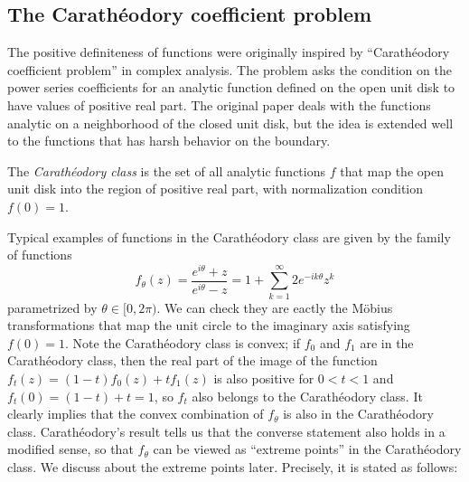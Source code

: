 \documentclass[12pt]{article}
\begin{document}
\subsection{The Carath\'eodory coefficient problem}

The positive definiteness of functions were originally inspired by ``Carath\'eodory coefficient problem'' in complex analysis.
The problem asks the condition on the power series coefficients for an analytic function defined on the open unit disk to have values of positive real part.
The original paper deals with the functions analytic on a neighborhood of the closed unit disk, but the idea is extended well to the functions that has harsh behavior on the boundary.

\begin{defn}
The \emph{Carath\'eodory class} is the set of all analytic functions $f$ that map the open unit disk into the region of positive real part, with normalization condition $f(0)=1$.
\end{defn}


Typical examples of functions in the Carath\'eodory class are given by the family of functions
\[f_\theta(z)=\frac{e^{i\theta}+z}{e^{i\theta}-z}=1+\sum_{k=1}^\infty2e^{-ik\theta}z^k\]
parametrized by $\theta\in[0,2\pi)$.
We can check they are eactly the M\"obius transformations that map the unit circle to the imaginary axis satisfying $f(0)=1$.
Note the Carath\'eodory class is convex; if $f_0$ and $f_1$ are in the Carath\'eodory class, then the real part of the image of the function $f_t(z)=(1-t)f_0(z)+tf_1(z)$ is also positive for $0<t<1$ and $f_t(0)=(1-t)+t=1$, so $f_t$ also belongs to the Carath\'eodory class.
It clearly implies that the convex combination of $f_\theta$ is also in the Carath\'eodory class.
Carath\'eodory's result tells us that the converse statement also holds in a modified sense, so that $f_\theta$ can be viewed as ``extreme points'' in the Carath\'eodory class.
We discuss about the extreme points later.
Precisely, it is stated as follows:
\end{document}
